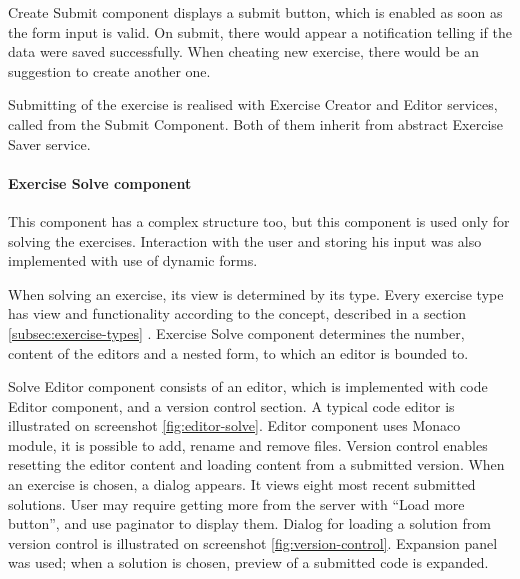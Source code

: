                Create Submit component displays a submit button, which is enabled as soon as the form input is valid. On submit, there would appear a notification telling if the data were saved successfully. When cheating new exercise, there would be an suggestion to create another one.
                
                Submitting of the exercise is realised with Exercise Creator and Editor services, called from the Submit Component. Both of them inherit from abstract Exercise Saver service.
    
                \paragraph{Exercise Solve component}
                This component has a complex structure too, but this component is used only for solving the exercises. Interaction with the user and storing his input was also implemented with use of dynamic forms.
                
                When solving an exercise, its view is determined by its type. Every exercise type has view and functionality according to the concept, described in a section \ref{subsec:exercise-types} . Exercise Solve component determines the number, content of the editors and a nested form, to which an editor is bounded to.
                
                Solve Editor component consists of an editor, which is implemented with code Editor component, and a version control section. A typical code editor is illustrated on screenshot \ref{fig:editor-solve}. Editor component uses Monaco module, it is possible to add, rename and remove files. Version control enables resetting the editor content and loading content from a submitted version. When an exercise is chosen, a dialog appears. It views eight most recent submitted solutions. User may require getting more from the server with ``Load more button'', and use paginator to display them. Dialog for loading a solution from version control is illustrated on screenshot \ref{fig:version-control}. Expansion panel was used; when a solution is chosen, preview of a submitted code is expanded.
                
